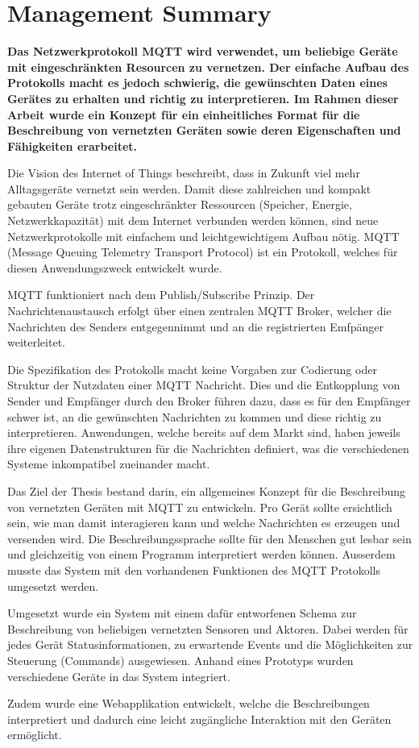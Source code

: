 \chapter*{Management Summary}
\label{chap:managementSummary}

\color{black}

\textbf{Das Netzwerkprotokoll MQTT wird verwendet, um beliebige Geräte mit eingeschränkten Resourcen zu vernetzen. Der einfache Aufbau des Protokolls macht es jedoch schwierig, die gewünschten Daten eines Gerätes zu erhalten und richtig zu interpretieren. Im Rahmen dieser Arbeit wurde ein Konzept für ein einheitliches Format für die Beschreibung von vernetzten Geräten sowie deren Eigenschaften und Fähigkeiten erarbeitet.}


Die Vision des Internet of Things beschreibt, dass in Zukunft viel mehr Alltagsgeräte vernetzt sein werden. Damit diese zahlreichen und kompakt gebauten Geräte trotz eingeschränkter Ressourcen (Speicher, Energie, Netzwerkkapazität) mit dem Internet verbunden werden können, sind neue Netzwerkprotokolle mit einfachem und leichtgewichtigem Aufbau nötig. MQTT (Message Queuing Telemetry Transport Protocol) ist ein Protokoll, welches für diesen Anwendungszweck entwickelt wurde.

MQTT funktioniert nach dem Publish/Subscribe Prinzip. Der Nachrichtenaustausch erfolgt über einen zentralen MQTT Broker, welcher die Nachrichten des Senders entgegennimmt und an die registrierten Emfpänger weiterleitet.


Die Spezifikation des Protokolls macht keine Vorgaben zur Codierung oder Struktur der Nutzdaten einer MQTT Nachricht. Dies und die Entkopplung von Sender und Empfänger durch den Broker führen dazu, dass es für den Empfänger schwer ist, an die gewünschten Nachrichten zu kommen und diese richtig zu interpretieren. 
Anwendungen, welche bereits auf dem Markt sind, haben jeweils ihre eigenen Datenstrukturen für die Nachrichten definiert, was die verschiedenen Systeme inkompatibel zueinander macht.


Das Ziel der Thesis bestand darin, ein allgemeines Konzept für die Beschreibung von vernetzten Geräten mit MQTT zu entwickeln. Pro Gerät sollte ersichtlich sein, wie man damit interagieren kann und welche Nachrichten es erzeugen und versenden wird.
Die Beschreibungssprache sollte für den Menschen gut lesbar sein und gleichzeitig von einem Programm interpretiert werden können.
Ausserdem musste das System mit den vorhandenen Funktionen des MQTT Protokolls umgesetzt werden.


Umgesetzt wurde ein System mit einem dafür entworfenen Schema zur Beschreibung von beliebigen vernetzten Sensoren und Aktoren.
Dabei werden für jedes Gerät Statusinformationen, zu erwartende Events und die Möglichkeiten zur Steuerung (Commands) ausgewiesen. Anhand eines Prototyps wurden verschiedene Geräte in das System integriert.

Zudem wurde eine Webapplikation entwickelt, welche die Beschreibungen interpretiert und dadurch eine leicht zugängliche Interaktion mit den Geräten ermöglicht.